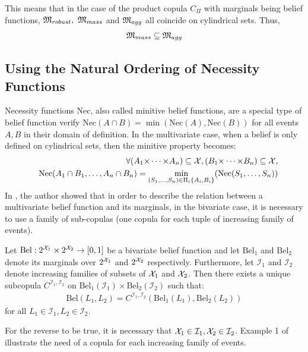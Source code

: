 This means that in the case of the product copula $C_\Pi$ with marginals being belief functions, ${\mathfrak{M}}_{robust},~{\mathfrak{M}}_{mass}$ and ${\mathfrak{M}}_{agg}$ all coincide on cylindrical sets. Thus,
\begin{eqnarray*}
    {\mathfrak{M}}_{mass}\subseteq{\mathfrak{M}}_{agg}
\end{eqnarray*}

\subsection{Using the Natural Ordering of Necessity Functions}\label{subsec:necessity_functions}
Necessity functions $\mathrm{Nec}$, also called minitive belief functions, are a special type of belief function verify $\mathrm{Nec}(A\cap B) =\min(\mathrm{Nec}(A), \mathrm{Nec}(B))$ for all events $A, B$ in their domain of definition. In the multivariate case, when a belief is only defined on cylindrical sets, then the minitive property becomes:
\begin{eqnarray}
    &&\forall (A_1{\times\dots\times} A_n)\subseteq{\mathcal{X}}, (B_1{\times\dots\times} B_n)\subseteq{\mathcal{X}},\nonumber\\
    &&\mathrm{Nec}(A_1\cap B_1,\dots, A_n\cap B_n) = \min_{(S_1,\dots,S_n)\in\Pi_i\{A_i,B_i\}}(\mathrm{Nec}(S_1, \dots, S_n))
\end{eqnarray}
In \cite{schmelzer_joint_2015}, the author showed that in order to describe the relation between a multivariate belief function and its marginals, in the bivariate case, it is necessary to use a family of sub-copulas (one copula for each tuple of increasing family of events).

\begin{theorem}\label{theorem:sklar_belief}
    Let $\mathrm{Bel}:2^{{\mathcal{X}}_1}\times2^{{\mathcal{X}}_2}\rightarrow[0,1]$ be a bivariate belief function and let $\mathrm{Bel}_1$ and $\mathrm{Bel}_2$ denote its marginals over $2^{{\mathcal{X}}_1}$ and $2^{{\mathcal{X}}_2}$ respectively. Furthermore, let $\mathcal{I}_1$ and $\mathcal{I}_2$ denote increasing families of subsets of ${\mathcal{X}}_1$ and ${\mathcal{X}}_2$. Then there exists a unique subcopula $C^{\mathcal{I}_1,\mathcal{I}_2}$ on  $\mathrm{Bel}_1(\mathcal{I}_1)\times \mathrm{Bel}_2(\mathcal{I}_2)$ such that:
    \begin{eqnarray}
        \mathrm{Bel}(L_1, L_2) = C^{\mathcal{I}_1,\mathcal{I}_2}(\mathrm{Bel}_1(L_1), \mathrm{Bel}_2(L_2))
    \end{eqnarray}
    for all $L_1\in\mathcal{I}_1,L_2\in\mathcal{I}_2$.
\end{theorem}
For the reverse to be true, it is necessary that ${\mathcal{X}}_1\in\mathcal{I}_1, {\mathcal{X}}_2\in\mathcal{I}_2$. Example 1 of \cite{schmelzer_joint_2015} illustrate the need of a copula for each increasing family of events.

